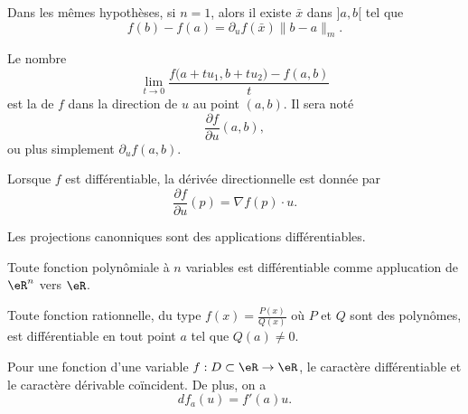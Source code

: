 \begin{corollary}
	Dans les mêmes hypothèses, si \( n=1\), alors il existe \( \bar x \) dans \( ]a,b[\) tel que
	\[
		f(b)-f(a)=\partial_uf(\bar x)\|b-a\|_m.
	\]
\end{corollary}

\begin{definition}
	Le nombre
	\begin{equation}
		\lim_{t\to 0} \frac{ f\big( a+tu_1,b+tu_2 \big)-f(a,b) }{ t }
	\end{equation}
	est la  de \( f\) dans la direction de \( u\) au point \( (a,b)\). Il sera noté
	\begin{equation}
		\frac{ \partial f }{ \partial u }(a,b),
	\end{equation}
	ou plus simplement \( \partial_uf(a,b)\).
\end{definition}

Lorsque \( f\) est différentiable, la dérivée directionnelle est donnée par
\begin{equation}        \label{EqDerDirnablau}
	\frac{ \partial f }{ \partial u }(p)=\nabla f(p)\cdot u.
\end{equation}


\begin{lemma}       \label{LEMooASGNooCWqAmN}
	Les projections canonniques sont des applications différentiables.
\end{lemma}

\begin{lemma}       \label{LEMooGYJUooOudNLH}
	Toute fonction polynômiale à \( n\) variables est différentiable comme applucation de \( \eR^n\) vers \( \eR\).
\end{lemma}

\begin{lemma}       \label{LEMooUMRXooDUQHpK}
	Toute fonction rationnelle, du type \( f(x) = \frac{P(x)}{Q(x)}\) où \( P\) et \( Q\) sont des polynômes, est différentiable en tout point \( a\) tel que \( Q(a) \neq 0\).
\end{lemma}


\begin{lemma}       \label{LEMooTPDSooGbxfhP}
	Pour une fonction d'une variable \( f : D \subset \eR \to \eR\), le caractère différentiable et le caractère dérivable coïncident. De plus, on a
	\begin{equation}
		d f_a(u) = f'(a) u.
	\end{equation}
\end{lemma}

